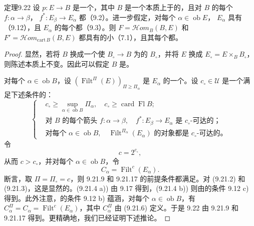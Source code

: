 \begin{SGAresult}{定理}{9.22}
设 $p:E\to B$ 是一个，其中 $B$ 是一个本质上于的，且对 $B$ 的每个 $f:\alpha\to\beta$， $f^*:E_\beta\to E_\alpha$ 都（9.2）。进一步假定，对每个 $\alpha\in\operatorname{ob}E$， $E_\alpha$ 具有（9.12），且 $E_\alpha$ 的每个都（9.3）。则 $F=\mathscr{H}om_B(B,E)$ 和 $F'=\mathscr{H}om_{\mathrm{cart}\,B}(B,E)$ 都具有的小（7.1），且其每个都。
\end{SGAresult}
\begin{proof}
显然，若将 $B$ 换成一个使 $B_\circ\to B$ 为的 $B_\circ$，并将 $E$ 换成 $E_\circ=E\times_B B_\circ$，则陈述本质上不变。因此可以假定 $B$ 是。

对每个 $\alpha\in\operatorname{ob}B$，设 $(\operatorname{Filt}^\Pi(E))_{\Pi\geq\Pi_\alpha}$ 是 $E_\alpha$ 的一个。设 $c_\circ\in\mathcal U$ 是一个满足下述条件的：
\[
\left\{\begin{aligned}
{}&c_\circ\geq\sup_{\alpha\in\operatorname{ob}B}\Pi_\alpha,
\quad c_\circ\geq\operatorname{card}\operatorname{Fl}B;\\
&\text{对 }B\text{ 的每个箭头 }f:\alpha\to\beta,
\quad f^*:E_\beta\to E_\alpha\text{ 是 }c_\circ\text{-可达的；}\\
&\text{对每个 }\alpha\in\operatorname{ob}B,
\quad\operatorname{Filt}^{\Pi_\alpha}(E_\alpha)\text{ 的对象都是 }c_\circ\text{-可达的。}
\end{aligned}\right.\tag{9.22.1}
\]
令
\[
c=2^{c_\circ},
\]
从而 $c>c_\circ$，并对每个 $\alpha\in\operatorname{ob}B$，令
\[
C_\alpha=\operatorname{Filt}^c(E_\alpha).
\]
断言，取 $\Pi=\Pi_\circ=c$，则 9.21.9 和 9.21.17 的前提条件都满足。对 (9.21.2) 和 (9.21.3)，这是显然的。(9.21.4 a)) 由 9.17 得到，(9.21.4 b)) 则由的条件 9.12 c) 得到。此外注意，的条件 9.12 b) 蕴涵，对每个 $\alpha\in\operatorname{ob}B$，有 $C_\alpha^\Pi=C_\alpha=\operatorname{Filt}^c(E_\alpha)$，其中 $C_\alpha^\Pi$ 由 (9.21.6) 定义。于是 9.22 由 9.21.9 和 9.21.17 得到。更精确地，我们已经证明下述推论。
\end{proof}

